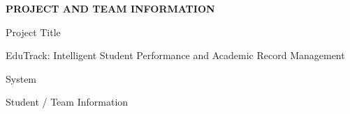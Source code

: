 \documentclass[11pt,a4paper]{article}
\newcommand{\blueheading}[1]{%
  {\sffamily\color{TitleBlue}\fontsize{15}{18}\selectfont #1}%
}
\newcommand{\bluebigheading}[1]{%
  {\sffamily\bfseries\color{TitleBlue}\fontsize{16}{19}\selectfont #1}%
}
\begin{document}
\vspace*{4mm}
\bluebigheading{PROJECT AND TEAM INFORMATION}

\vspace{13mm}
\blueheading{Project Title}

\vspace{2mm}
\begin{answerbox}
\begin{center}
\fontsize{10.5}{13}\selectfont
EduTrack: Intelligent Student Performance and Academic Record Management\par
System
\end{center}
\end{answerbox}

\vspace{13mm}
\blueheading{Student / Team Information}
\end{document}
